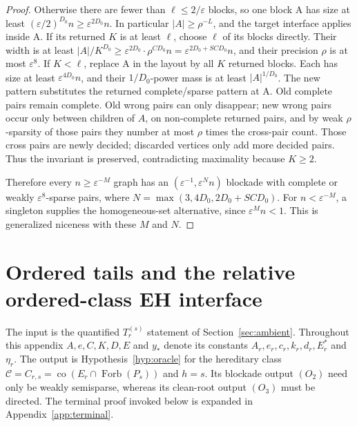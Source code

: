 \documentclass[11pt,a4paper]{article}
\theoremstyle{definition}
\theoremstyle{remark}
\numberwithin{equation}{section}
\DeclareMathOperator{\Forb}{Forb}
\DeclareMathOperator{\co}{co}
\begin{document}
\begin{proof}
Otherwise there are fewer than \(\ell\le\allowbreak 2/\varepsilon\) blocks, so one block A has size at least \((\varepsilon/2)^{D_{0}} n\ge\allowbreak \varepsilon^{2D_{0}}n\). In particular \(|A|\ge\allowbreak \rho^{-L}\), and the target interface applies inside A. If its returned \(K\) is at least \(\ell\), choose \(\ell\) of its blocks directly. Their width is at least \(|A|/K^{D_{0}} \ge\allowbreak \varepsilon^{2D_{0}}\cdot \rho^{C D_{0}}n =\varepsilon^{2D_{0}+S C D_{0}}n\), and their precision \(\rho\) is at most \(\varepsilon^{8}\). If \(K<\ell\), replace A in the layout by all \(K\) returned blocks. Each has size at least \(\varepsilon^{4D_{0}}n\), and their \(1/D_{0}\)-power mass is at least \(|A|^{1/D_{0}}\). The new pattern substitutes the returned complete/sparse pattern at A. Old complete pairs remain complete. Old wrong pairs can only disappear; new wrong pairs occur only between children of \(A\), on non-complete returned pairs, and by weak \(\rho\)-sparsity of those pairs they number at most \(\rho\) times the cross-pair count. Those cross pairs are newly decided; discarded vertices only add more decided pairs. Thus the invariant is preserved, contradicting maximality because \(K\ge\allowbreak 2\).

Therefore every \(n\ge\allowbreak \varepsilon^{-M}\) graph has an \((\varepsilon^{-1},\allowbreak \varepsilon^{N} n)\) blockade with complete or weakly \(\varepsilon^{8}\)-sparse pairs, where \(N=\max (3,\allowbreak 4D_{0},\allowbreak 2D_{0}+S C D_{0})\). For \(n<\varepsilon^{-M}\), a singleton supplies the homogeneous-set alternative, since \(\varepsilon^{M}n<1\). This is generalized niceness with these \(M\) and \(N\).
\end{proof}

\section{Ordered tails and the relative ordered-class EH interface}\label{app:tail}

The input is the quantified \(T_r^{(s)}\) statement of Section~\ref{sec:ambient}. Throughout this appendix \(A,e,C,K,D,E\) and \(y_{*}\) denote its constants \(A_{r},e_{r},c_{r},k_{r},d_{r},E_{r}^{*}\) and \(\eta_{r}\). The output is Hypothesis~\ref{hyp:oracle} for the hereditary class \(\mathcal C=C_{r,s}=\co(E_r\cap\Forb(P_s))\) and \(h=s\). Its blockade output \((O_{2})\) need only be weakly semisparse, whereas its clean-root output \((O_{3})\) must be directed. The terminal proof invoked below is expanded in Appendix~\ref{app:terminal}.
\end{document}
